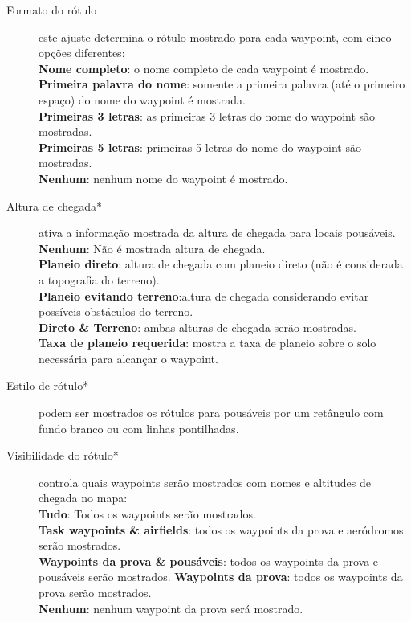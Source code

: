 \begin{description}
\item[Formato do rótulo]  este ajuste  \label{conf:labels} determina o rótulo mostrado para cada waypoint, com cinco opções diferentes: \\
  {\bf Nome completo}: o nome completo de cada waypoint é mostrado. \\
  {\bf Primeira palavra do nome}: somente a primeira palavra (até o primeiro espaço) do nome do waypoint é mostrada.
 \\
  {\bf Primeiras 3 letras}: as primeiras 3 letras do nome do waypoint são mostradas. \\
  {\bf Primeiras 5 letras}: primeiras 5 letras do nome do waypoint são mostradas. \\
  {\bf Nenhum}: nenhum nome do waypoint é mostrado.
\item[Altura de chegada*] \label{conf:arrivalheight} ativa a informação mostrada da altura de chegada para locais pousáveis. \\
  {\bf Nenhum}: Não é mostrada altura de chegada. \\
  {\bf Planeio direto}: altura de chegada com planeio direto (não é considerada a topografia do terreno). \\
  {\bf Planeio evitando terreno}:altura de chegada considerando evitar possíveis obstáculos do terreno.  \\
  {\bf Direto \& Terreno}: ambas alturas de chegada serão mostradas. \\
  {\bf Taxa de planeio requerida}: mostra a taxa de planeio sobre o solo necessária para alcançar o waypoint.
\item[Estilo de rótulo*]  podem ser mostrados os rótulos para pousáveis por um retângulo com fundo branco ou com linhas pontilhadas.
\item[Visibilidade do rótulo*]  \label{conf:labelvisibility} controla quais waypoints serão mostrados com nomes e altitudes de chegada no mapa: \\
  {\bf Tudo}: Todos os waypoints serão mostrados. \\
  {\bf Task waypoints \& airfields}: todos os waypoints da prova e aeródromos serão mostrados. \\
  {\bf Waypoints da prova \& pousáveis}: todos os waypoints da prova e pousáveis serão mostrados.
  {\bf Waypoints da prova}: todos os waypoints da prova serão mostrados. \\
  {\bf Nenhum}:  nenhum waypoint da prova será mostrado.

\end{description}
